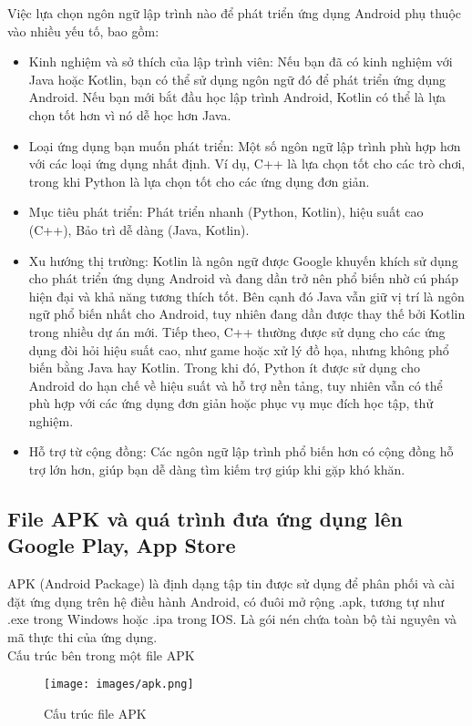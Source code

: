         Việc lựa chọn ngôn ngữ lập trình nào để phát triển ứng dụng Android phụ thuộc vào nhiều yếu tố, bao gồm:
        \setlength{\leftmargini}{1.5cm}
        \begin{itemize}
            \item Kinh nghiệm và sở thích của lập trình viên: Nếu bạn đã có kinh nghiệm với Java hoặc Kotlin, bạn có thể sử dụng ngôn ngữ đó để phát triển ứng dụng Android. Nếu bạn mới bắt đầu học lập trình Android, Kotlin có thể là lựa chọn tốt hơn vì nó dễ học hơn Java.
            \item Loại ứng dụng bạn muốn phát triển: Một số ngôn ngữ lập trình phù hợp hơn với các loại ứng dụng nhất định. Ví dụ, C++ là lựa chọn tốt cho các trò chơi, trong khi Python là lựa chọn tốt cho các ứng dụng đơn giản.
            \item Mục tiêu phát triển: Phát triển nhanh (Python, Kotlin), hiệu suất cao (C++), Bảo trì dễ dàng (Java, Kotlin).
            \item Xu hướng thị trường: Kotlin là ngôn ngữ được Google khuyến khích sử dụng cho phát triển ứng dụng Android và đang dần trở nên phổ biến nhờ cú pháp hiện đại và khả năng tương thích tốt. Bên cạnh đó Java vẫn giữ vị trí là ngôn ngữ phổ biến nhất cho Android, tuy nhiên đang dần được thay thế bởi Kotlin trong nhiều dự án mới. Tiếp theo, C++ thường được sử dụng cho các ứng dụng đòi hỏi hiệu suất cao, như game hoặc xử lý đồ họa, nhưng không phổ biến bằng Java hay Kotlin. Trong khi đó, Python ít được sử dụng cho Android do hạn chế về hiệu suất và hỗ trợ nền tảng, tuy nhiên vẫn có thể phù hợp với các ứng dụng đơn giản hoặc phục vụ mục đích học tập, thử nghiệm.        
            \item Hỗ trợ từ cộng đồng: Các ngôn ngữ lập trình phổ biến hơn có cộng đồng hỗ trợ lớn hơn, giúp bạn dễ dàng tìm kiếm trợ giúp khi gặp khó khăn.   
        \end{itemize}

    \subsection{File APK và quá trình đưa ứng dụng lên Google Play, App Store}
    \renewcommand{\labelitemi}{--}
        \hspace*{0.8cm}APK (Android Package) là định dạng tập tin được sử dụng để phân phối và cài đặt ứng dụng trên hệ điều hành Android, có đuôi mở rộng .apk, tương tự như .exe trong Windows hoặc .ipa trong IOS. Là gói nén chứa toàn bộ tài nguyên và mã thực thi của ứng dụng.\\
        Cấu trúc bên trong một file APK
        \begin{figure}[H] 
            \centering
            \texttt{[image: images/apk.png]}
            \caption{Cấu trúc file APK}
            \label{fig:android}
        \end{figure}
        
